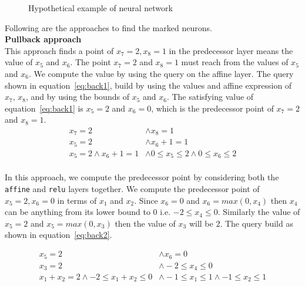 \begin{figure}[!ht]
	\centering
	\scalebox{0.8}{}
	\caption{Hypothetical example of neural network}
	\label{fig:motivating}
\end{figure}


Following are the approaches to find the marked neurons.
\\
\textbf{Pullback approach}\\
This approach finds a point of $x_7=2,x_8=1$ in the predecessor layer means the value of $x_5$ and $x_6$. 
The point $x_7=2$ and $x_8=1$ must reach from the values of $x_5$ and $x_6$. 
We compute the value by using the \sat{} query on the affine layer. The \sat{} query shown 
in equation~\ref{eq:back1}, 
build by using the values and affine expression of $x_7$, $x_8$, and by using the bounds of $x_5$ and $x_6$.
The satisfying value of equation~\ref{eq:back1} is $x_5=2$ and $x_6=0$, which is the predecessor point of $x_7=2$
and $x_8=1$.  
\begin{equation}
    \begin{aligned}
        x_7 = 2 & \land x_8 = 1 \\
        x_5 = 2 & \land x_6 + 1 = 1 \\ 
        x_5=2\land x_6+1 = 1 & \land 0\leq x_5 \leq 2 \land 0\leq x_6 \leq 2 \\
    \end{aligned}
\label{eq:back1}
\end{equation}

In this approach, we compute the predecessor point by considering both the \texttt{affine} and \texttt{relu} layers together. 
We compute the predecessor point of $x_5=2, x_6=0$ in terms of $x_1$ and $x_2$.
Since $x_6=0$ and $x_6=max(0,x_4)$ then $x_4$ can be anything from its lower bound to $0$ i.e. $-2 \leq x_4 \leq 0$.
Similarly the value of $x_5=2$ and $x_5=max(0,x_3)$ then the value of $x_3$ will be $2$. 
The \sat{} query build as shown in equation~\ref{eq:back2}. 

\begin{equation}
    \begin{aligned}
        x_5 = 2 & \land x_6 = 0 \\
        x_3 = 2 & \land -2\leq x_4 \leq 0 \\ 
        x_1+x_2=2\land -2\leq  x_1+x_2 \leq 0 & \land -1\leq x_1 \leq 1 \land -1\leq x_2 \leq 1 \\
    \end{aligned}
\label{eq:back2}
\end{equation}

